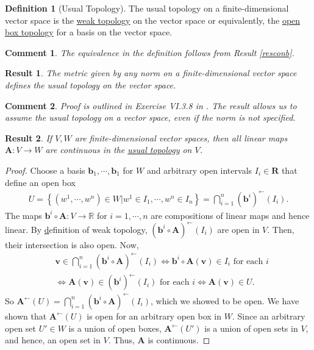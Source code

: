 \documentclass[letterpaper,12pt]{article}
\theoremstyle{plain}
\newtheorem{res}{Result}
\theoremstyle{plain}
\newtheorem*{cmnt*}{Comment}
\theoremstyle{definition}
\newtheorem{defn}{Definition}
\begin{document}
\begin{defn}[Usual Topology]\label{defutop}
The usual topology on a finite-dimensional vector space is the \hyperref[defwtop]{weak topology} on the vector space or equivalently, the \hyperref[defotop]{open box topology} for a basis on the vector space.
\end{defn}

\begin{cmnt*} The equivalence in the definition follows from Result \ref{resconb}.
\end{cmnt*}

\begin{res}\label{vsutop}
The metric given by any norm on a finite-dimensional vector space defines the usual topology on the vector space.
\end{res}

\begin{cmnt*} Proof is outlined in Exercise VI.3.8 in \citet{Dodson/Poston:1991}. The result allows us to assume the usual topology on a vector space, even if the norm is not specified.
\end{cmnt*}


\begin{res}
If $V,W$ are finite-dimensional vector spaces, then all linear maps $\mathbf{A}:V\rightarrow W$ are continuous in the \hyperref[defutop]{usual topology} on $V$.
\end{res}
\begin{proof}
Choose a basis $\mathbf{b}_1,\cdots,\mathbf{b}_1$ for $W$ and arbitrary open intervals $I_i\in \mathbf{R}$ that define an open box
\begin{align*}
U = \left\{(w^1,\cdots,w^n)\in W|w^1\in I_1,\cdots,w^n\in I_n \right\}=\bigcap_{i=1}^{n}\left(\mathbf{b}^i\right)^{\leftarrow}(I_i).
\end{align*}
The maps $\mathbf{b}^i\circ \mathbf{A}:V\rightarrow \mathbb{R}$ for $i=1,\cdots,n$ are compositions of linear maps and hence linear. By \hyperref[defwtop]definition of weak topology, $\left( \mathbf{b}^i\circ \mathbf{A}\right)^{\leftarrow}\left( I_i\right)$ are open in $V$. Then, their intersection is also open. Now,
\begin{align*}
&\mathbf{v}\in \bigcap_{i=1}^{n}\left(\mathbf{b}^i\circ \mathbf{A}\right)^{\leftarrow}(I_i) \iff \mathbf{b}^i\circ \mathbf{A}(\mathbf{v})\in I_i \text{ for each }i \\
&\iff \mathbf{A}(\mathbf{v}) \in \left( \mathbf{b}^i \right)^{\leftarrow} \left( I_i \right) \text{ for each }i \iff \mathbf{A}(\mathbf{v}) \in U.
\end{align*}
So $\mathbf{A}^{\leftarrow}(U) = \bigcap_{i=1}^{n}\left(\mathbf{b}^i\circ \mathbf{A}\right)^{\leftarrow}(I_i)$, which we showed to be open. We have shown that $\mathbf{A}^{\leftarrow}(U)$ is open for an arbitrary open box in $W$. Since an arbitrary open set $U'\in W$ is a union of open boxes, $\mathbf{A}^{\leftarrow}(U')$ is a union of open sets in $V$, and hence, an open set in $V$. Thus, $\mathbf{A}$ is continuous.
\end{proof}
\end{document}
